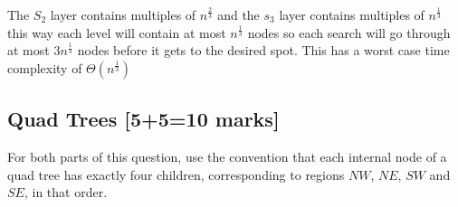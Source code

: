 \documentclass[12pt]{article}
\begin{document}
\begin{enumerate}
      The $S_2$ layer contains multiples of $n^{\frac{2}{3}}$ and the $s_3$ layer contains multiples of $n^{\frac{1}{3}}$ this way each level will contain at most $n^{\frac{1}{3}}$ nodes so each search will go through at most $3n^{\frac{1}{3}}$ nodes before it gets to the desired spot. This has a worst case time complexity of $\Theta(n^{\frac{1}{3}})$
\end{enumerate}

\subsection{Quad Trees [5+5=10 marks]}
For both parts of this question, use the convention that each
internal node of a quad tree has exactly four children, corresponding
to regions $NW$, $NE$, $SW$ and $SE$, in that order.
\end{document}
